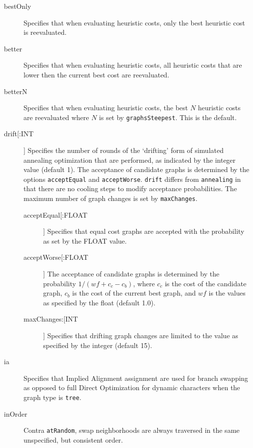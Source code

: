 \begin{description}
		\item[bestOnly] Specifies that when evaluating heuristic costs, only the best heuristic cost is 
		reevaluated.
		
		\item[better] Specifies that when evaluating heuristic costs, all heuristic costs that are lower 
		then the current best cost are reevaluated.
		
		\item[betterN] Specifies that when evaluating heuristic costs, the best $N$ heuristic costs are 
		reevaluated where $N$ is set by \texttt{graphsSteepest}. This is the default.
		
		\item[drift[:INT]] Specifies the number of rounds of the `drifting' form of simulated 
		annealing \citep{goloboff1999} optimization that are performed, as indicated by the integer 
		value (default 1). The acceptance of candidate graphs is determined by the options 
		\texttt{acceptEqual} and \texttt{acceptWorse}. \texttt{drift} differs from \texttt{annealing} 
		in that there are no cooling steps to modify acceptance probabilities. The maximum 
		number of graph changes is set by \texttt{maxChanges}.
			
		\begin{description}
			
			\item[acceptEqual[:FLOAT]] Specifies that equal cost graphs are accepted with the
			probability as set by the FLOAT value. 
			
			\item[acceptWorse[:FLOAT]] The acceptance of candidate graphs is determined by the 
			probability $1/ (wf + c_c - c_b)$, where $c_c$ is the cost of the candidate graph, $c_b$ 
			is the cost of the current best graph, and $wf$ is the values as specified by the float 
			(default 1.0). 	
			
			\item[maxChanges:[INT]] Specifies that drifting graph changes are limited to the 
			value as specified by the integer (default 15).
			
		\end{description}
		
		\item[ia] Specifies that Implied Alignment \citep{Wheeler2003} assignment are used for 
		branch swapping as opposed to full Direct Optimization for dynamic characters when the 
		graph type is \texttt{tree}.
		
		\item[inOrder] Contra \texttt{atRandom}, swap neighborhoods are always traversed 
		in the same unspecified, but consistent order.
		

\end{description}

